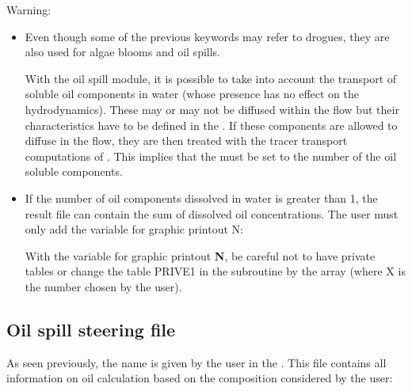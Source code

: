 \begin{WarningBlock}{Warning:}
\begin{itemize}
\item Even though some of the previous keywords may refer to drogues,
they are also used for algae blooms and oil spills.

With the oil spill module, it is possible to take into account the transport
of soluble oil components in water (whose presence has no effect on the
hydrodynamics).
These may or may not be diffused within the flow but their characteristics have
to be defined in the .
If these components are allowed to diffuse in the flow, they are then treated
with the tracer transport computations of .
This implies that
the  must be set to the number of the oil soluble
components.

\item If the number of oil components dissolved in water is greater than 1,
the result file can contain the sum of dissolved oil concentrations.
The user must only add the variable for graphic printout N:


With the variable for graphic printout \textbf{N}, be careful not to have
private tables or change the table PRIVE1 in the 
subroutine by the  array (where X is the number chosen by the
user).
\end{itemize}
\end{WarningBlock}

\subsection{Oil spill steering file}

As seen previously, the  name is given
by the user in the  .
This file contains all information on oil calculation based on the composition
considered by the user:

